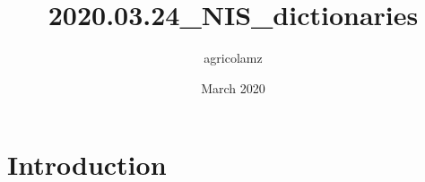 \documentclass{article}
\title{2020.03.24_NIS_dictionaries}
\author{agricolamz }
\date{March 2020}
\begin{document}
\maketitle

\section{Introduction}
\end{document}
